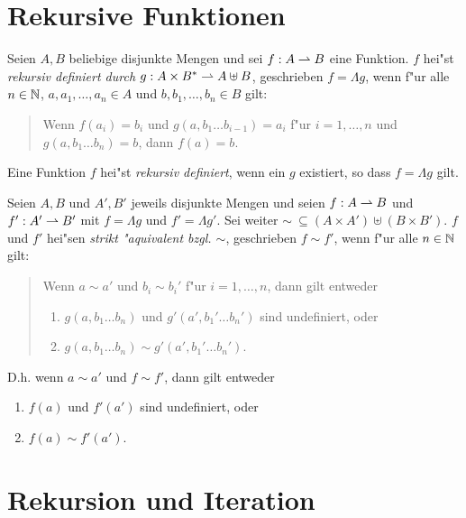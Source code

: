 \documentclass[12pt,a4paper]{article}
\begin{document}
\section{Rekursive Funktionen}

Seien $A,B$ beliebige disjunkte Mengen und sei $f: A \rightharpoonup B$ eine Funktion. $f$ hei"st \emph{rekursiv
definiert durch $g:A \times B^* \rightharpoonup A \uplus B$}, geschrieben $f = \Lambda g$, wenn f"ur alle
$n \in \mathbb N$, $a,a_1,\ldots,a_n \in A$ und $b,b_1,\ldots,b_n \in B$ gilt:
\begin{quote}
  Wenn $f(a_i) = b_i$ und $g(a,b_1 \ldots b_{i-1}) = a_i$ f"ur $i = 1,\ldots,n$ und
  $g(a,b_1 \ldots b_n) = b$, dann $f(a) = b$.
\end{quote}
Eine Funktion $f$ hei"st \emph{rekursiv definiert}, wenn ein $g$ existiert, so dass $f = \Lambda g$
gilt.

Seien $A,B$ und $A',B'$ jeweils disjunkte Mengen und seien $f: A \rightharpoonup B$ und $f': A' \rightharpoonup B'$ mit
$f = \Lambda g$ und $f' = \Lambda g'$. Sei weiter $\sim\ \subseteq (A \times A') \uplus (B \times B')$.
$f$ und $f'$ hei"sen \emph{strikt "aquivalent bzgl. $\sim$}, geschrieben $f \sim f'$, wenn f"ur alle $n \in \mathbb N$ gilt:
\begin{quote}
  Wenn $a \sim a'$ und $b_i \sim b_i'$ f"ur $i = 1,\ldots,n$, dann gilt entweder
  \begin{enumerate}
  \item $g(a,b_1 \ldots b_n)$ und $g'(a',b_1' \ldots b_n')$ sind undefiniert, oder
  \item $g(a,b_1 \ldots b_n) \sim g'(a',b_1' \ldots b_n')$.
  \end{enumerate}
\end{quote}
D.h. wenn $a \sim a'$ und $f \sim f'$, dann gilt entweder
\begin{enumerate}
\item $f(a)$ und $f'(a')$ sind undefiniert, oder
\item $f(a) \sim f'(a')$.
\end{enumerate}


\section{Rekursion und Iteration}
\end{document}
